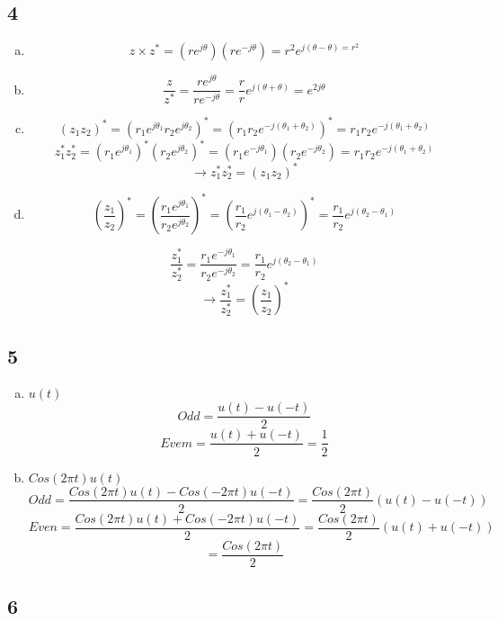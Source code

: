 \documentclass[10pt, letterpaper]{article}
\begin{document}
\subsection*{4}

\begin{enumerate}[a.]
\item
\[z \times z^* = (re^{j\theta})(re^{-j\theta}) = r^2 e^{j(\theta - \theta) = r^2} \]

\item
\[ \frac{z}{z^*} = \frac{re^{j\theta}}{re^{-j\theta}} = \frac{r}{r} e^{j (\theta + \theta)} = e^{2j\theta} \]

\item
\[(z_1 z_2)^* = (r_1 e^{j \theta_1} r_2 e^{j \theta_2})^* = (r_1 r_2 e^{-j(\theta_1 + \theta_2)})^* = r_1 r_2 e^{-j(\theta_1 + \theta_2)}\]
\[z_1^* z_2^* = (r_1e^{j\theta_1})^* (r_2e^{j\theta_2})^* = (r_1e^{-j\theta_1}) (r_2e^{-j\theta_2})  = r_1 r_2 e^{-j(\theta_1 + \theta_2)} \]
\[\rightarrow z_1^* z_2^* = (z_1 z_2)^*\]

\item
\[
(\frac{z_1}{z_2})^*  = (\frac{r_1e^{j\theta_1}}{r_2e^{j\theta_2}})^* =   (\frac{r_1}{r_2} e^{j(\theta_1 - \theta_2)})^* =     
\frac{r_1}{r_2} e^{j(\theta_2 - \theta_1)}
\]

\[
\frac{z_1^*}{z_2^*} =
\frac{r_1 e^{-j\theta_1}}{r_2 e^{-j\theta_2}} = 
\frac{r_1}{r_2} e^{j(\theta_2 - \theta_1)}
\]
\[
\rightarrow
\frac{z_1^*}{z_2^*} =(\frac{z_1}{z_2})^* 
\]
\end{enumerate}

\subsection*{5}

\begin{enumerate}[a.]
\item $u(t)$
\[ Odd = \frac{u(t) - u(-t)}{2}\]
\[Evem = \frac{u(t) + u(-t)}{2} =  \frac{1}{2}\]

\item $Cos(2\pi t)u(t)$
\[Odd = \frac{Cos(2\pi t)u(t) - Cos(-2\pi t)u(-t)}{2} = \frac{Cos(2\pi t)}{2}(u(t) - u(-t))\]
\[Even = \frac{Cos(2\pi t)u(t) + Cos(-2\pi t)u(-t)}{2} = \frac{Cos(2\pi t)}{2}(u(t) + u(-t))\]
\[ = \frac{Cos(2\pi t)}{2}\]
\end{enumerate}


\subsection*{6}
\end{document}
